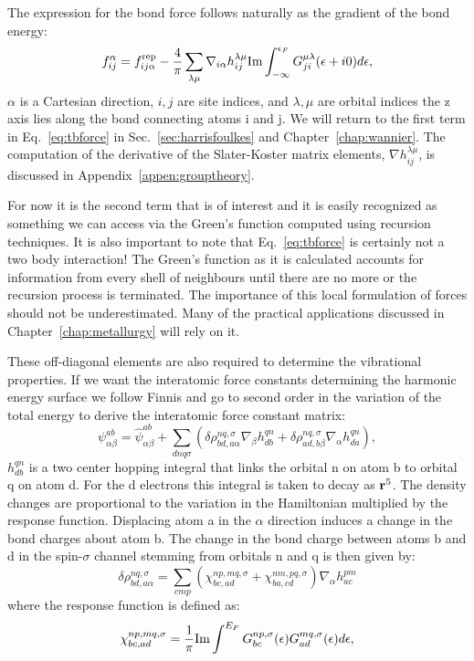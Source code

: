 The expression for the bond force follows naturally as the gradient of the bond energy:
%
\begin{equation}
\label{eq:tbforce}
f_{ij}^{\alpha} = f^{\rm rep}_{ij\alpha} - \frac{4}{\pi}\sum_{\lambda\mu} 
\nabla_{i\alpha}h_{ij}^{\lambda\mu}{\rm Im}\int_{-\infty}^{\epsilon_{F}}G_{ji}^{\mu\lambda}(\epsilon+i0)d\epsilon,
\end{equation}
%
$\alpha$ is a Cartesian direction, $i,j$ are site indices, and $\lambda, \mu$ are orbital indices 
the z axis lies along the bond connecting atoms i and j. 
We will return to the first term in Eq.~\ref{eq:tbforce} in Sec.~\ref{sec:harrisfoulkes} 
and Chapter~\ref{chap:wannier}. The computation of the derivative
of the Slater-Koster matrix elements, $\nabla h_{ij}^{\lambda\mu}$,
is discussed in Appendix~\ref{appen:grouptheory}.

For now it is the second term that is of interest and
it is easily recognized as something we can access via the Green's function 
computed using recursion techniques. It is also important to note that 
Eq.~\ref{eq:tbforce} is certainly not a two body interaction! The Green's function 
as it is calculated accounts for information from every shell of neighbours 
until there are no more or the recursion process is terminated. 
The importance of this local formulation of forces should not be underestimated.
Many of the practical applications discussed in Chapter~\ref{chap:metallurgy} 
will rely on it.

%
These off-diagonal elements are also required to determine the vibrational properties. 
If we want the interatomic force constants determining the harmonic energy surface 
we follow Finnis\cite{finnis84} and go to second order in the variation of the 
total energy to derive the interatomic force constant matrix:
%
\begin{equation}
\label{eq:tbdynmat}
\psi_{\alpha\beta}^{ab} = \hat{\psi}_{\alpha\beta}^{ab} +  \sum_{dnq\sigma}(\delta 
\rho_{bd,a\alpha}^{nq,\sigma}\nabla_{\beta}h_{db}^{qn} + \delta\rho_{ad,b\beta}^{nq,\sigma}\nabla_{\alpha}h_{da}^{qn}),
\end{equation}
%
$h^{qn}_{db}$ is a two center hopping integral that links the orbital n on atom b to orbital 
q on atom d. For the d electrons this integral is taken to decay as
${\bf r}^{5}$. The density changes are proportional to the variation in the Hamiltonian 
multiplied by the response function. Displacing atom a in the $\alpha$ direction induces a change in the
bond charges about atom b. The change in the bond charge between atoms b and d 
in the spin-$\sigma$ channel stemming from orbitals n and q is then given by:
%
\begin{equation}
\label{eq:tbdeltarho}
\delta \rho_{bd,a\alpha}^{nq,\sigma} = \sum_{cmp}(\chi_{bc,ad}^{np,mq,\sigma}+\chi_{ba,cd}^{nm,pq,\sigma})\nabla_{\alpha}h_{ac}^{pm}
\end{equation}
%
where the response function is defined as:
%
\begin{equation}
\label{eq:tbresponse}
\chi_{bc,ad}^{np,mq,\sigma} = \frac{1}{\pi}{\rm Im}\int^{E_{F}}G_{bc}^{np,\sigma}(\epsilon)G_{ad}^{mq,\sigma}(\epsilon)d\epsilon,
\end{equation}
%


